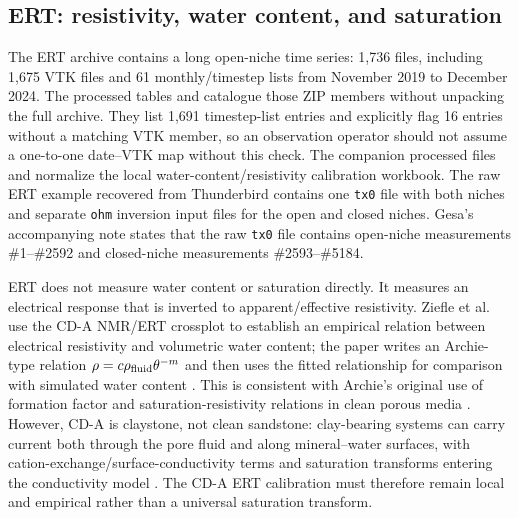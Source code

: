 \subsection{ERT: resistivity, water content, and saturation}

The ERT archive contains a long open-niche time series: 1,736 files, including
1,675 VTK files and 61 monthly/timestep lists from November 2019 to December 2024.
The processed tables  and 
catalogue those ZIP members without unpacking the full archive.  They list 1,691
timestep-list entries and explicitly flag 16 entries without a matching VTK member,
so an observation operator should not assume a one-to-one date--VTK map without this
check.  The companion processed files  and
 normalize the local water-content/resistivity
calibration workbook.
The raw ERT example recovered from Thunderbird contains one \texttt{tx0} file with
both niches and separate \texttt{ohm} inversion input files for the open and closed
niches.  Gesa's accompanying note states that the raw \texttt{tx0} file contains
open-niche measurements \#1--\#2592 and closed-niche measurements \#2593--\#5184.

ERT does not measure water content or saturation directly.  It measures an electrical
response that is inverted to apparent/effective resistivity.  Ziefle et al. use the
CD-A NMR/ERT crossplot to establish an empirical relation between electrical
resistivity and volumetric water content; the paper writes an Archie-type relation
\(\rho=c\rho_{\rm fluid}\theta^{-m}\) and then uses the fitted relationship for
comparison with simulated water content \cite[p.~4453, Eq.~4 and p.~4457,
Sect.~5.1]{WaterContentEDZ2024}.  This is consistent with Archie's original use of
formation factor and saturation-resistivity relations in clean porous media
\cite[pp.~54--58]{Archie1942}.  However, CD-A is claystone, not clean
sandstone: clay-bearing systems can carry current both through the pore fluid and
along mineral--water surfaces, with cation-exchange/surface-conductivity terms and
saturation transforms entering the conductivity model
\cite[pp.~23925--23927 and p.~23930, Eq.~17]{Revil1998ShalySands}.  The CD-A ERT
calibration must therefore remain local and empirical rather than a universal
saturation transform.

